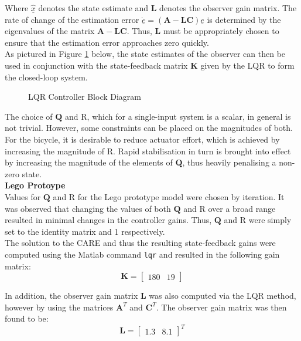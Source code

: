 Where $\underline{\hat{x}}$ denotes the state estimate and $\mathbf{L}$ denotes the observer gain matrix. The rate of change of the estimation error $\dot{\underline{e}} = (\mathbf{A - \mathbf{L C}}) \underline{e}$ is determined by the eigenvalues of the matrix $\mathbf{A - \mathbf{L C}}$. Thus, $\mathbf{L}$ must be appropriately chosen to ensure that the estimation error approaches zero quickly. \\

As pictured in Figure \ref{fig:LQR} below, the state estimates of the observer can then be used in conjunction with the state-feedback matrix $\mathbf{K}$ given by the LQR to form the closed-loop system. \\

\begin{figure}[H]
	\centering
    \def\svgwidth{0.5\textwidth}
    
    \caption{LQR Controller Block Diagram}
	\label{fig:LQR}
\end{figure}

The choice of $\mathbf{Q}$ and R, which for a single-input system is a scalar, in general is not trivial. However, some constraints can be placed on the magnitudes of both. For the bicycle, it is desirable to reduce actuator effort, which is achieved by increasing the magnitude of R. Rapid stabilisation in turn is brought into effect by increasing the magnitude of the elements of $\mathbf{Q}$, thus heavily penalising a non-zero state. \\

\textbf{Lego Protoype} \\
Values for $\mathbf{Q}$ and R for the Lego prototype model were chosen by iteration. It was observed that changing the values of both $\mathbf{Q}$ and R over a broad range resulted in minimal changes in the controller gains. Thus, $\mathbf{Q}$ and R were simply set to the identity matrix and 1 respectively. \\
The solution to the CARE and thus the resulting state-feedback gains were computed using the Matlab command \texttt{lqr} and resulted in the following gain matrix:
\begin{equation*}
\mathbf{K} = \begin{bmatrix}
180 & 19
\end{bmatrix}
\end{equation*}

In addition, the observer gain matrix $\mathbf{L}$ was also computed via the LQR method, however by using the matrices $\mathbf{A}^T$ and $\mathbf{C}^T$. The observer gain matrix was then found to be:
\begin{equation*}
\mathbf{L} = \begin{bmatrix}
1.3 & 8.1
\end{bmatrix}^T
\end{equation*}

